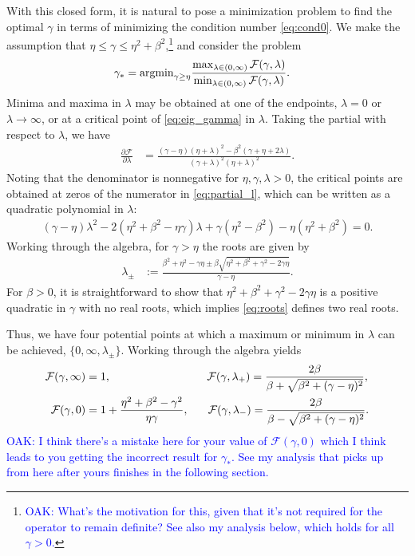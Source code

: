 \documentclass[a4paper,10pt]{article}
\newcommand{\tcb}{\textcolor{blue}}
\begin{document}
With this closed form, it is natural to pose a minimization problem to find the
optimal $\gamma$ in terms of minimizing the condition number \eqref{eq:cond0}.
We make the assumption that $\eta \leq \gamma \leq \eta^2+\beta^2$,\footnote{\tcb{OAK: What's the motivation for this, given that it's not required for the operator to remain definite? See also my analysis below, which holds for all $\gamma> 0$.}} and consider
the problem
%
\begin{align}\label{eq:gam_opt}
\gamma_* & = \textnormal{argmin}_{\gamma \geq \eta}
	\frac{\max_{\lambda\in(0,\infty)} \mathcal{F}(\gamma,\lambda)}
		{\min_{\lambda\in(0,\infty)} \mathcal{F}(\gamma,\lambda)}.
\end{align}
%
Minima and maxima in $\lambda$ may be obtained at one of the endpoints,
$\lambda = 0$ or $\lambda\to\infty$, or at a critical point of \eqref{eq:eig_gamma}
in $\lambda$. Taking the partial with respect to $\lambda$, we have
%
\begin{align}\label{eq:partial_l}
\frac{\partial\mathcal{F}}{\partial\lambda} & =
	\frac{(\gamma-\eta)(\eta+\lambda)^2 - \beta^2(\gamma+\eta+2\lambda)}
		{(\gamma+\lambda)^2(\eta+\lambda)^2}.
\end{align}
%
Noting that the denominator is nonnegative for $\eta,\gamma,\lambda > 0$, the
critical points are obtained at zeros of the numerator in \eqref{eq:partial_l},
which can be written as a quadratic polynomial in $\lambda$:
%
\begin{align*}
(\gamma-\eta)\lambda^2 - 2(\eta^2+\beta^2 - \eta\gamma)\lambda + 
	\gamma(\eta^2-\beta^2) - \eta(\eta^2+\beta^2) = 0.
\end{align*}
%
Working through the algebra, for $\gamma > \eta$ the roots are given by
%
\begin{align}\label{eq:roots}
\lambda_{\pm} & := \frac{\beta^2 + \eta^2 - \gamma\eta \pm \beta\sqrt{\eta^2+\beta^2 + \gamma^2 - 2\gamma\eta}}{\gamma-\eta}.
\end{align}
%
For $\beta > 0$, it is straightforward to show that $\eta^2+\beta^2 + \gamma^2 - 2\gamma\eta$
is a positive quadratic in $\gamma$ with no real roots, which implies \eqref{eq:roots}
defines two real roots.

Thus, we have four potential points at which a maximum or minimum in $\lambda$
can be achieved, $\{0,\infty, \lambda_\pm\}$. Working through the algebra yields
%
\begin{align*}
\mathcal{F}(\gamma,\infty) & = 1, \hspace{20ex}
\mathcal{F}(\gamma,\lambda_+) = \frac{2\beta}{\beta + \sqrt{\beta^2 + (\gamma-\eta)^2}}, \\
\mathcal{F}(\gamma,0) & = 1 + \frac{\eta^2+\beta^2-\gamma^2}{\eta\gamma},
\hspace{4ex}
\mathcal{F}(\gamma,\lambda_-) = \frac{2\beta}{\beta - \sqrt{\beta^2 + (\gamma-\eta)^2}}.
\end{align*}
\tcb{OAK: I think there's a mistake here for your value of $\mathcal{F}(\gamma,0)$ which I think leads to you getting the incorrect result for $\gamma_*$. See my analysis that picks up from here after yours finishes in the following section.}
%
\end{document}
